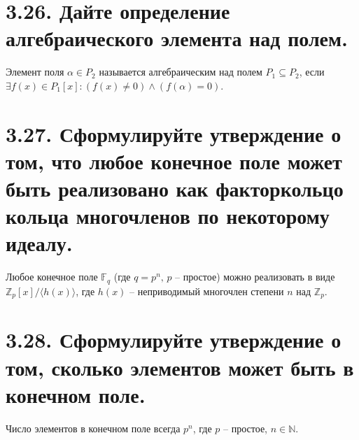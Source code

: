 \documentclass{article}
\begin{document}
\section*{\LARGE 3.26. Дайте определение алгебраического элемента над полем. }
Элемент поля $\alpha \in P_2$ называется алгебраическим над полем $P_1 \subseteq P_2$, если $\exists f(x) \in P_1[x] : (f(x) \ne 0) \wedge (f(\alpha) = 0)$.

\section*{\LARGE 3.27. Сформулируйте утверждение о том, что любое конечное поле может быть реализовано как факторкольцо кольца многочленов по некоторому идеалу. }
Любое конечное поле $\mathbb{F}_q$ (где $q = p^n,\, p$ -- простое) можно реализовать в виде $\mathbb{Z}_p[x] / \langle h(x) \rangle$, где $h(x)$ -- неприводимый многочлен степени $n$ над $\mathbb{Z}_p$.

\section*{\LARGE 3.28. Сформулируйте утверждение о том, сколько элементов может быть в конечном поле. }
Число элементов в конечном поле всегда $p^n$, где $p$ -- простое, $n \in \mathbb{N}$.

\end{document}
